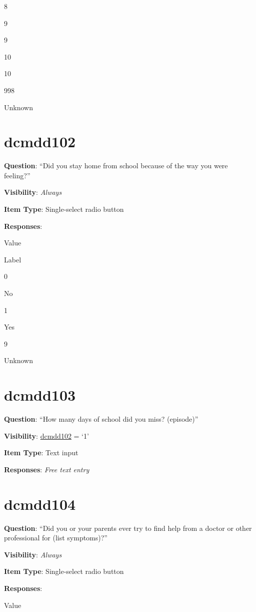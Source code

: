 \documentclass[]{book}
\begin{document}
8

9

9

10

10

998

Unknown

\hypertarget{dcmdd102}{%
\section{dcmdd102}\label{dcmdd102}}

\textbf{Question}: ``Did you stay home from school because of the way you were feeling?''

\textbf{Visibility}: \emph{Always}

\textbf{Item Type}: Single-select radio button

\textbf{Responses}:

Value

Label

0

No

1

Yes

9

Unknown

\hypertarget{dcmdd103}{%
\section{dcmdd103}\label{dcmdd103}}

\textbf{Question}: ``How many days of school did you miss? (episode)''

\textbf{Visibility}: \protect\hyperlink{dcmdd102}{dcmdd102} = `1'

\textbf{Item Type}: Text input

\textbf{Responses}: \emph{Free text entry}

\hypertarget{dcmdd104}{%
\section{dcmdd104}\label{dcmdd104}}

\textbf{Question}: ``Did you or your parents ever try to find help from a doctor or other professional for (list symptoms)?''

\textbf{Visibility}: \emph{Always}

\textbf{Item Type}: Single-select radio button

\textbf{Responses}:

Value
\end{document}
